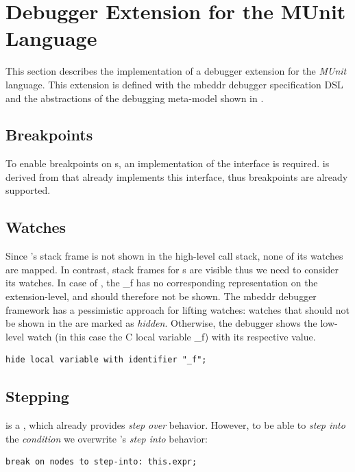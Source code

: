 \section{Debugger Extension for the MUnit Language}

This section describes the implementation of a debugger extension
for the \emph{MUnit} language. This extension is defined with the mbeddr
debugger specification \ac{DSL} and the abstractions of the debugging
meta-model shown in .

\subsection{Breakpoints}  To enable
breakpoints on s, 
an implementation of the  interface is required.
 is derived from  that already implements
this interface, thus breakpoints are already supported.

\subsection{Watches} 

Since 's  stack frame is not shown in the high-level
call stack, none of its watches are mapped.
In contrast,  stack frames for s are visible thus we need
to consider its watches. In case of , the 
 \_f has no corresponding
representation on the extension-level, and should therefore not be shown. The
mbeddr debugger framework has a pessimistic approach for lifting watches:
watches that should not be shown in the  are marked as \emph{hidden}.
Otherwise, the debugger shows the low-level watch (in this case the C local
variable \_f) with its respective value.

\begin{lstlisting}[frame=single,language=debuggerDSL]
hide local variable with identifier "_f";
\end{lstlisting}

\subsection{Stepping} 

 is a , which
already provides \emph{step over} behavior. However, to be able to 
\emph{step into} the \emph{condition} we overwrite 's 
\emph{step into} behavior: 
\begin{lstlisting}[language=debuggerDSL,frame=single]
break on nodes to step-into: this.expr;
\end{lstlisting}

